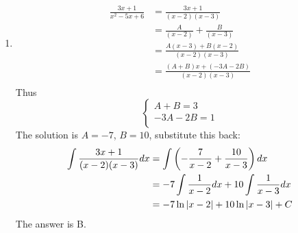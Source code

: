 \documentclass{article}
\numberwithin{equation}{section}
\begin{document}
\begin{enumerate}
    \item 
    \begin{align*}
    \frac{3x+1}{x^2-5x+6} &= \frac{3x+1}{(x-2)(x-3)}\\
    &= \frac{A}{(x-2)} + \frac{B}{(x-3)}\\
    &= \frac{A(x-3) + B(x-2)}{(x-2)(x-3)}\\
    &= \frac{(A+B)x + (-3A-2B)}{(x-2)(x-3)}\\
    \end{align*}
    Thus
    \[
    \begin{cases}
        A + B = 3\\
        -3A - 2B = 1\\
    \end{cases}
    \]
    The solution is $A = -7$, $B = 10$, substitute this back:
    \begin{align*}
        \int \frac{3x+1}{(x-2)(x-3)} dx &= \int \left(-\frac{7}{x-2} + \frac{10}{x-3}\right)dx\\
        &= -7\int \frac{1}{x-2}dx + 10\int \frac{1}{x-3} dx\\
        &= -7 \ln \abs{x-2} +10\ln \abs{x-3}+C\\
    \end{align*}
    The answer is B.


\end{enumerate}
\end{document}
